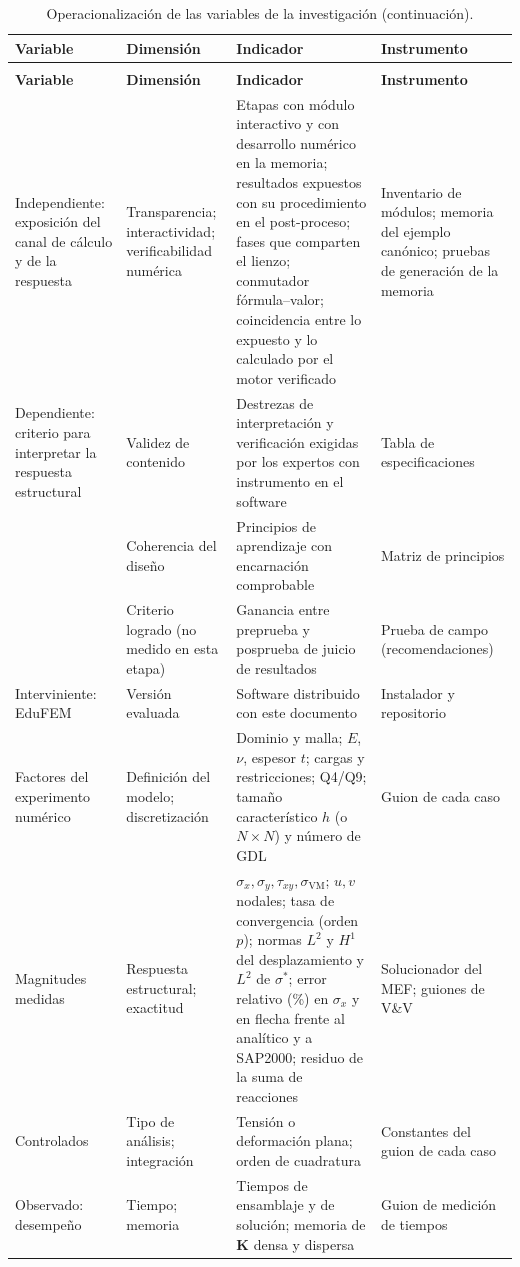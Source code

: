 {\footnotesize
\setlength{\tabcolsep}{3pt}
\renewcommand{\arraystretch}{1.15}
\begin{longtable}{@{}>{\raggedright\arraybackslash}p{2.9cm}>{\raggedright\arraybackslash}p{3.0cm}>{\raggedright\arraybackslash}p{5.0cm}>{\raggedright\arraybackslash}p{2.7cm}@{}}
\caption{Operacionalización de las variables de la investigación.}\label{tab:variables}\\
\toprule
\textbf{Variable} & \textbf{Dimensión} & \textbf{Indicador} & \textbf{Instrumento} \\
\midrule
\endfirsthead
\caption[]{Operacionalización de las variables de la investigación (continuación).}\\
\toprule
\textbf{Variable} & \textbf{Dimensión} & \textbf{Indicador} & \textbf{Instrumento} \\
\midrule
\endhead
\bottomrule
\endfoot
Independiente: exposición del canal de cálculo y de la respuesta & Transparencia; interactividad; verificabilidad numérica & Etapas con módulo interactivo y con desarrollo numérico en la memoria; resultados expuestos con su procedimiento en el post-proceso; fases que comparten el lienzo; conmutador fórmula--valor; coincidencia entre lo expuesto y lo calculado por el motor verificado & Inventario de módulos; memoria del ejemplo canónico; pruebas de generación de la memoria \\
Dependiente: criterio para interpretar la respuesta estructural & Validez de contenido & Destrezas de interpretación y verificación exigidas por los expertos con instrumento en el software & Tabla de especificaciones \\
 & Coherencia del diseño & Principios de aprendizaje con encarnación comprobable & Matriz de principios \\
 & Criterio logrado (no medido en esta etapa) & Ganancia entre preprueba y posprueba de juicio de resultados & Prueba de campo (recomendaciones) \\
Interviniente: EduFEM & Versión evaluada & Software distribuido con este documento & Instalador y repositorio \\
\midrule
Factores del experimento numérico & Definición del modelo; discretización & Dominio y malla; $E$, $\nu$, espesor $t$; cargas y restricciones; Q4/Q9; tamaño característico $h$ (o $N\times N$) y número de GDL & Guion de cada caso \\
Magnitudes medidas & Respuesta estructural; exactitud & $\sigma_x,\sigma_y,\tau_{xy},\sigma_{\mathrm{VM}}$; $u,v$ nodales; tasa de convergencia (orden $p$); normas $L^2$ y $H^1$ del desplazamiento y $L^2$ de $\sigma^*$; error relativo (\%) en $\sigma_x$ y en flecha frente al analítico y a SAP2000; residuo de la suma de reacciones & Solucionador del MEF; guiones de V\&V \\
Controlados & Tipo de análisis; integración & Tensión o deformación plana; orden de cuadratura & Constantes del guion de cada caso \\
Observado: desempeño & Tiempo; memoria & Tiempos de ensamblaje y de solución; memoria de $\bm{K}$ densa y dispersa & Guion de medición de tiempos \\
\end{longtable}}

